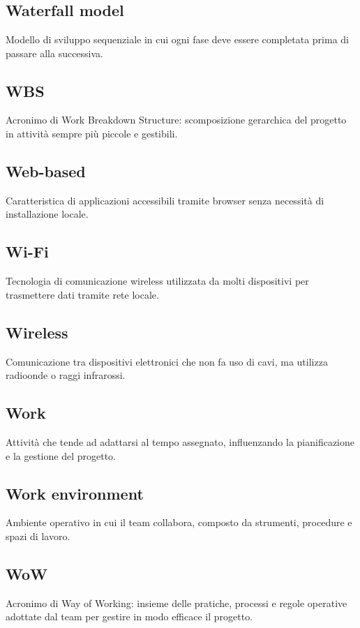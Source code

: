 \documentclass[a4paper,12pt]{article}
\begin{document}
\newpage
        \section{}
        
          \subsection*{Waterfall model}
			Modello di sviluppo sequenziale in cui ogni fase deve essere completata prima di passare alla successiva.
          \subsection*{WBS}
			Acronimo di Work Breakdown Structure: scomposizione gerarchica del progetto in attività sempre più piccole e gestibili. 
          \subsection*{Web-based}
			Caratteristica di applicazioni accessibili tramite browser senza necessità di installazione locale.
          \subsection*{Wi-Fi}
			Tecnologia di comunicazione wireless utilizzata da molti dispositivi per trasmettere dati tramite rete locale.
          \subsection*{Wireless}
			Comunicazione tra dispositivi elettronici che non fa uso di cavi, ma utilizza radioonde o raggi infrarossi.
          \subsection*{Work}
			Attività che tende ad adattarsi al tempo assegnato, influenzando la pianificazione e la gestione del progetto.
          \subsection*{Work environment}
			Ambiente operativo in cui il team collabora, composto da strumenti, procedure e spazi di lavoro.
          \subsection*{WoW}
			Acronimo di Way of Working: insieme delle pratiche, processi e regole operative adottate dal team per gestire in modo efficace il progetto.          
        
\end{document}
